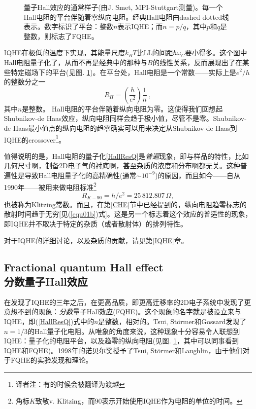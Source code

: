 \documentclass[10pt]{book}
\newcommand{\beq}{\begin{equation}}
\newcommand{\eeq}{\end{equation}}
\newcommand\itt{\it\color{blue}}
\begin{document}
\begin{figure}
\begin{center}
\end{center}
\caption{量子Hall效应的通常样子(由J. Smet, MPI-Stuttgart测量)。每一个Hall电阻的平台伴随着零纵向电阻。经典Hall电阻由dashed-dotted线表示。数字标识了平台：整数$n$表示IQHE；而$n=p/q$，其中$p$和$q$是整数，则标志了FQHE。}
\label{fig03}
\end{figure}
IQHE在极低的温度下实现，其能量尺度$k_BT$比LL的间距$\hbar\omega_C$要小得多。这个图中Hall电阻量子化了，从而不再是经典中的那种与$B$的线性关系，反而展现出了在某些特定磁场下的平台(见图. \ref{fig03})。在平台处，Hall电阻是一个常数——实际上是$e^2/h$的整数分之一
\beq\label{HallResQ}
R_H = \left(\frac{h}{e^2}\right)\frac{1}{n}\ ,
\eeq
其中$n$是整数。
\renewcommand*{\thefootnote}{\fnsymbol{footnote}}
Hall电阻的平台伴随着纵向电阻为零。这使得我们回想起Shubnikov-de Haas效应，纵向电阻同样会趋于极小值，尽管不是零。Shubnikov-de Haas最小值点的纵向电阻的趋零确实可以用来决定从Shubnikov-de Haas到IQHE的crossover\footnote[3]{译者注：有的时候会被翻译为渡越}。
\renewcommand*{\thefootnote}{\arabic{footnote}}

值得说明的是，Hall电阻的量子化\eqref{HallResQ}是{\itt 普遍}现象，即与样品的特性，比如几何尺寸啊，制备2D电子气的衬底啊，甚至杂质的浓度和分布啊都无关。这种普遍性是导致Hall电阻量子化的高精确性(通常$\sim 10^{-9}$)的原因，而且如今——自从1990年——被用来做电阻标准\footnote{角标$K$致敬v. Klitzing，而$90$表示开始使用IQHE作为电阻的单位的时间。}
\beq\label{klitz}
 R_{K-90}=h/e^2 = 25\, 812.807\, \Omega,
\eeq
也被称为Klitzing常数\cite{metrology1,metrology2}。而且，在第\ref{CHE}节中已经提到的，纵向电阻趋零标志的散射时间趋于无穷[见(\ref{equ01b})式]。这是另一个标志着这个效应的普适性的现象，即IQHE并不取决于特定的杂质（或者散射体）的排列特性。

对于IQHE的详细讨论，以及杂质的贡献，请见第\ref{IQHE}章。


\subsection[分数量子Hall效应]{Fractional quantum Hall effect\\\bf 分数量子Hall效应}

在发现了IQHE的三年之后，在更高品质，即更高迁移率的2D电子系统中发现了更意想不到的现象：{\itt 分数}量子Hall效应(FQHE)。这个现象的名字就是被设立来与IQHE，即(\ref{HallResQ})式中的$n$是整数，相对的。Tsui, St\"ormer和Gossard发现了$n=1/3$\cite{TSG}的Hall量子化电阻。从唯象的角度来说，这种现象十分容易令人联想到IQHE：量子化的电阻平台，以及趋零的纵向电阻(见图. \ref{fig03}，其中可以同事看到IQHE和FQHE)。1998年的诺贝尔奖授予了Tsui, St\"ormer和Laughlin，由于他们对于FQHE的实验发现和理论。
\end{document}
